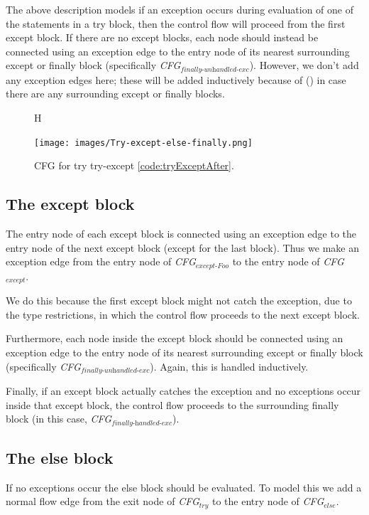 The above description models if an exception occurs during evaluation of one of the statements in a try block, then the control flow will proceed from the first except block. If there are no except blocks, each node should instead be connected using an exception edge to the entry node of its nearest surrounding except or finally block (specifically \textit{CFG$_{\textit{finally-unhandled-exc}}$}). However, we don't add any exception edges here; these will be added inductively because of (\inlinecode{*}) in case there are any surrounding except or finally blocks.

\begin{figure}{H}
  \begin{center}
    \texttt{[image: images/Try-except-else-finally.png]}
  \end{center}
  \caption{CFG for try try-except \autoref{code:tryExceptAfter}.}
  \label{fig:tryExceptAfter}
\end{figure}

\subsection{The except block}
The entry node of each except block is connected using an exception edge to the entry node of the next except block (except for the last block). Thus we make an exception edge from the entry node of \textit{CFG$_{\textit{except-Foo}}$} to the entry node of \textit{CFG$_{\textit{except}}$}.

We do this because the first except block might not catch the exception, due to the type restrictions, in which the control flow proceeds to the next except block.

Furthermore, each node inside the except block should be connected using an exception edge to the entry node of its nearest surrounding except or finally block (specifically \textit{CFG$_{\textit{finally-unhandled-exc}}$}). Again, this is handled inductively.

Finally, if an except block actually catches the exception and no exceptions occur inside that except block, the control flow proceeds to the surrounding finally block (in this case, \textit{CFG$_{\textit{finally-handled-exc}}$}). 



\subsection{The else block}
If no exceptions occur the else block should be evaluated. To model this we add a normal flow edge from the exit node of \textit{CFG$_{\textit{try}}$} to the entry node of \textit{CFG$_{\textit{else}}$}.

